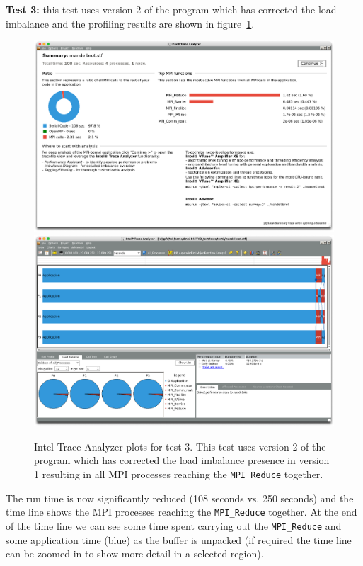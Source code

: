 \documentclass[a4paper,titlepage]{article}
\begin{document}
\noindent
\textbf{Test 3:} this test uses version 2 of the program which has corrected the load imbalance and the profiling results are shown in figure~\ref{fig:test3_ITAC_summary}.
\begin{figure}[htbp]
\begin{center}
\includegraphics[scale=0.3]{figures/test3_summary}
\includegraphics[scale=0.3]{figures/test3_eventTimeline}
\caption{Intel Trace Analyzer plots for test 3. This test uses version 2 of the program which has corrected the load imbalance presence in version 1 resulting in all MPI processes reaching the \texttt{MPI\_Reduce} together.}
\label{fig:test3_ITAC_summary}
\end{center}
\end{figure}
The run time is now significantly reduced (108 seconds vs. 250 seconds) and the time line shows the MPI processes reaching the \verb+MPI_Reduce+ together. At the end of the time line we can see some time spent carrying out the \verb+MPI_Reduce+ and some application time (blue) as the buffer is unpacked (if required the time line can be zoomed-in to show more detail in a selected region). \\
\end{document}
